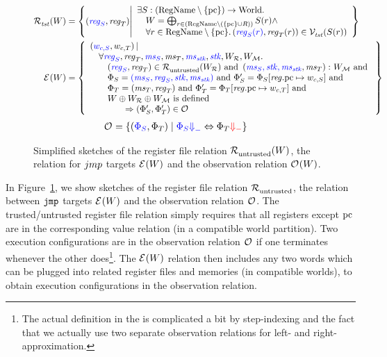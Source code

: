 \documentclass[acmsmall,screen]{acmart}\settopmatter{}
\renewcommand{\npair}[2][n]{#2}
\renewcommand{\RegName}{\shareddom{RegName}}
\renewcommand{\lre}[1][]{\typesetlr{E}^{#1}}
\renewcommand{\lrrg}[2][]{\typesetlr{R}^{#1}_{#2}}
\renewcommand{\lrr}[1][]{\lrrg[#1]{\untrusted}}
\renewcommand{\lro}[1][]{\typesetlr{O}^{#1}}
\renewcommand{\lrvg}[2][]{\typesetlr{V}^{#1}_{#2}}
\renewcommand{\lrrs}{\typesetlr{R}}
\renewcommand{\lrm}{\typesetlr{M}}
\renewcommand{\memSat}[3][]{\memSatGeneric{#1}{#2}{#3}{}}
\begin{document}
\begin{figure}
  \centering
\begin{align*}
  \lrrg{\trust}(W) &= \left\{ \npair{\stpair{\reg}{\reg}} \middle|
    \begin{array}{l}
      \exists S : (\RegName \setminus \{\pcreg \})\fun \World \ldotp \\
      \quad W = \bigoplus_{r \in (\RegName\setminus (\{\pcreg \} \cup R))} S(r) \wedge \\
      \quad \forall r \in \RegName \setminus \{\pcreg \}\ldotp \npair{\stpair[.]{\src{\reg_S(r)}}{\reg_T(r)}} \in \lrvg{\trust}(S(r))
    \end{array}
            \right\}\\
  \lre(W)&= \left\{ \begin{array}{l}
    \npair{\stpair[.]{w_{c,S}}{w_{c,T}}} | \\
    \quad\forall \src{\reg_S}, \reg_T, \src{\ms_S}, \ms_T, \src{\ms_\stk}, \src{\stk}, W_\lrrs , W_\lrm \ldotp \\
    \qquad\npair{\stpair{\reg}{\reg}} \in \lrr(W_\lrrs ) \tand \memSat{\stpair[.]{\ms_S,\stk,\ms_\stk}{\ms_T}}{W_\lrm} \tand\\
    \qquad\Phi_S = \src{(\ms_S,\reg_S,\stk, \ms_\stk)} \tand \Phi_S' = \Phi_S \updReg{\pcreg}{w_{c,S}} \tand\\
                     \qquad\Phi_T = (\ms_T,\reg_T) \tand \Phi_T' = \Phi_T\updReg{\pcreg}{w_{c,T}} \tand \\
                     \qquad W \oplus W_\lrrs \oplus W_\lrm \text{ is defined }\\
    \qquad\qquad\Rightarrow\npair{\left(\Phi_S', \Phi_T' \right)}\in \lro
  \end{array}
  \right\}
\end{align*}
  \begin{align*}
  \lro[] ={}&\{ \npair{\left(\src{\Phi_S},\Phi_T\right)} \mid
    \src{\Phi_S \sterm{}} \Leftrightarrow \Phi_T \trg{\term} \}
\end{align*}
\caption{Simplified sketches of the register file relation $\lrr(W)$, the relation
  for ${\color{black} jmp}$ targets $\lre(W)$  and the observation relation $\lro(W)$.}
\label{fig:obs-rel}
\end{figure}

In Figure~\ref{fig:obs-rel}, we show sketches of the register file relation $\lrr$, the relation between $\tjmp{}$ targets $\lre(W)$ and the observation relation $\lro$.
The trusted/untrusted register file relation simply requires that all registers except $\mathrm{pc}$ are in the corresponding value relation (in a compatible world partition).
Two execution configurations are in the observation relation $\lro$ if one terminates whenever the other does\footnote{The actual definition in the \cite{technical_report} is complicated a bit by step-indexing and the fact that we actually use two separate observation relations for left- and right-approximation.}.
The $\lre(W)$ relation then includes any two words which can be plugged into related register files and memories (in compatible worlds), to obtain execution configurations in the observation relation.
\end{document}
